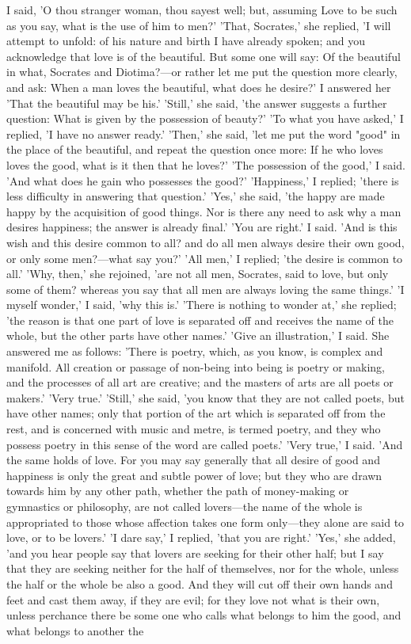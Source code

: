 \documentclass[11pt,letter]{article}
\begin{document}
\par  I said, 'O thou stranger woman, thou sayest well; but, assuming Love to be such as you say, what is the use of him to men?' 'That, Socrates,' she replied, 'I will attempt to unfold: of his nature and birth I have already spoken; and you acknowledge that love is of the beautiful. But some one will say: Of the beautiful in what, Socrates and Diotima?—or rather let me put the question more clearly, and ask: When a man loves the beautiful, what does he desire?' I answered her 'That the beautiful may be his.' 'Still,' she said, 'the answer suggests a further question: What is given by the possession of beauty?' 'To what you have asked,' I replied, 'I have no answer ready.' 'Then,' she said, 'let me put the word "good" in the place of the beautiful, and repeat the question once more: If he who loves loves the good, what is it then that he loves?' 'The possession of the good,' I said. 'And what does he gain who possesses the good?' 'Happiness,' I replied; 'there is less difficulty in answering that question.' 'Yes,' she said, 'the happy are made happy by the acquisition of good things. Nor is there any need to ask why a man desires happiness; the answer is already final.' 'You are right.' I said. 'And is this wish and this desire common to all? and do all men always desire their own good, or only some men?—what say you?' 'All men,' I replied; 'the desire is common to all.' 'Why, then,' she rejoined, 'are not all men, Socrates, said to love, but only some of them? whereas you say that all men are always loving the same things.' 'I myself wonder,' I said, 'why this is.' 'There is nothing to wonder at,' she replied; 'the reason is that one part of love is separated off and receives the name of the whole, but the other parts have other names.' 'Give an illustration,' I said. She answered me as follows: 'There is poetry, which, as you know, is complex and manifold. All creation or passage of non-being into being is poetry or making, and the processes of all art are creative; and the masters of arts are all poets or makers.' 'Very true.' 'Still,' she said, 'you know that they are not called poets, but have other names; only that portion of the art which is separated off from the rest, and is concerned with music and metre, is termed poetry, and they who possess poetry in this sense of the word are called poets.' 'Very true,' I said. 'And the same holds of love. For you may say generally that all desire of good and happiness is only the great and subtle power of love; but they who are drawn towards him by any other path, whether the path of money-making or gymnastics or philosophy, are not called lovers—the name of the whole is appropriated to those whose affection takes one form only—they alone are said to love, or to be lovers.' 'I dare say,' I replied, 'that you are right.' 'Yes,' she added, 'and you hear people say that lovers are seeking for their other half; but I say that they are seeking neither for the half of themselves, nor for the whole, unless the half or the whole be also a good. And they will cut off their own hands and feet and cast them away, if they are evil; for they love not what is their own, unless perchance there be some one who calls what belongs to him the good, and what belongs to another the 
\end{document}
